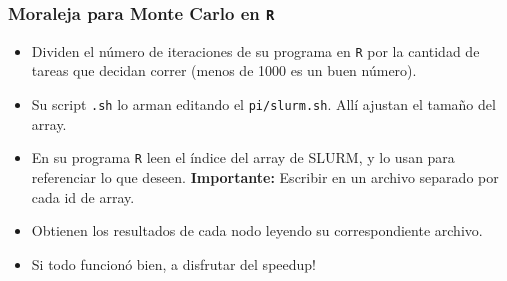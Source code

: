 \documentclass[handout]{beamer}
\begin{document}
\begin{frame}[fragile]
\frametitle{Moraleja para Monte Carlo en \Verb=R=}
\begin{itemize}
  \item Dividen el número de iteraciones de su programa en \Verb=R= por la cantidad de tareas que decidan correr (menos de 1000 es un buen número).
  \item Su script \Verb=.sh= lo arman editando el \Verb=pi/slurm.sh=. Allí ajustan el tamaño del array.
  \item En su programa \Verb=R= leen el índice del array de SLURM, y lo usan para referenciar lo que deseen. \textbf{Importante:} Escribir en un archivo separado por cada id de array.
  \item Obtienen los resultados de cada nodo leyendo su correspondiente archivo.
  \item Si todo funcionó bien, a disfrutar del speedup!
\end{itemize}
\end{frame}
\end{document}
